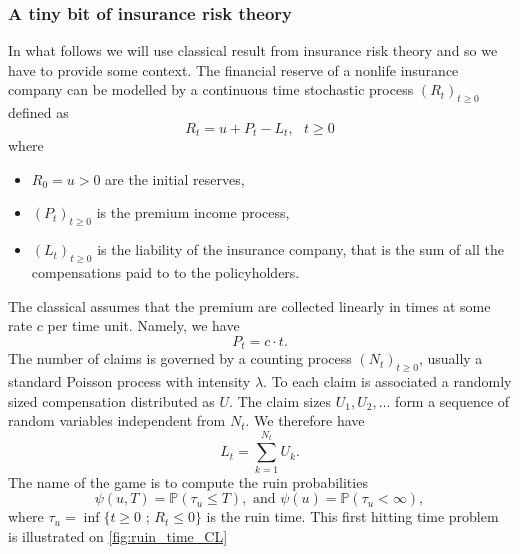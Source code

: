 \subsubsection{A tiny bit of insurance risk theory}\label{sssec:insurance_risk_theory}
In what follows we will use classical result from insurance risk theory and so we have to provide some context. The financial reserve of a nonlife insurance company can be modelled by a continuous time stochastic process $(R_t)_{t\geq0}$ defined as 
\begin{equation}\label{eq:risk_process}
R_t = u + P_t - L_t,\text{ }t\geq0
\end{equation}
where 
\begin{itemize}
  \item $R_0 = u>0$ are the initial reserves,
  \item $(P_t)_{t\geq0}$ is the premium income process,
  \item $(L_t)_{t\geq0}$ is the liability of the insurance company, that is the sum of all the compensations paid to to the policyholders.
\end{itemize}
The classical assumes that the premium are collected linearly in times at some rate $c$ per time unit. Namely, we have 
$$
P_t = c\cdot t.
$$
The number of claims is governed by a counting process $(N_t)_{t\geq0}$, usually a standard Poisson process with intensity $\lambda$. To each claim is associated a randomly sized compensation distributed as $U$. The claim sizes $U_1,U_2,\ldots$ form a sequence of \iid random variables independent from $N_t$. We therefore have 
$$
L_t = \sum_{k = 1}^{N_t}U_k.
$$
The name of the game is to compute the ruin probabilities 
\begin{equation}\label{eq:ruin_probabilities}
\psi(u,T) = \mathbb{P}(\tau_u \leq T),\text{ and }\psi(u) = \mathbb{P}(\tau_u < \infty),
\end{equation} 
where $\tau_u = \inf\{t\geq0\text{ ; }R_t \leq 0\}$ is the ruin time. This first hitting time problem is illustrated on \cref{fig:ruin_time_CL}

